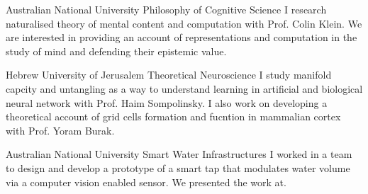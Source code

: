 {Australian National University}
{Philosophy of Cognitive Science}
{
	I research naturalised theory of mental content and computation with Prof. Colin Klein. We are interested in providing an account of representations and computation in the study of mind and defending their epistemic value.
}

{Hebrew University of Jerusalem}
{Theoretical Neuroscience}
{
	I study manifold capcity and untangling as a way to understand learning in artificial and biological neural network with Prof. Haim Sompolinsky. I also work on developing a theoretical account of grid cells formation and fucntion in mammalian cortex with Prof. Yoram Burak.  
}

{Australian National University}
{Smart Water Infrastructures}
{
	I worked in a team to design and develop a prototype of a smart tap that modulates water volume via a computer vision enabled sensor. We presented the work at.
}